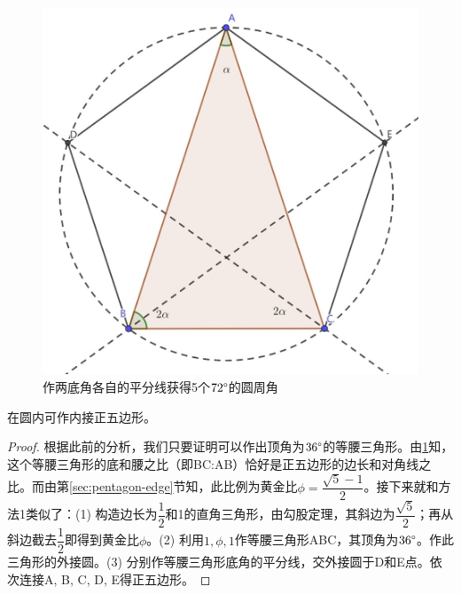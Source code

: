 \documentclass[b5paper]{ctexart}
\begin{document}
\begin{figure}[htbp]
 \centering
 \includegraphics[scale=0.35]{img/triangle-pentagon}
 \caption{作两底角各自的平分线获得5个$72\degree$的圆周角}
 \label{fig:triangle-pentagon}
\end{figure}

\begin{proposition}[欧几里得《原本》，卷4，命题11]
在圆内可作内接正五边形。
\end{proposition}

\begin{proof}
根据此前的分析，我们只要证明可以作出顶角为$36\degree$的等腰三角形。由\cref{fig:triangle-pentagon}知，这个等腰三角形的底和腰之比（即BC:AB）恰好是正五边形的边长和对角线之比。而由第\ref{sec:pentagon-edge}节知，此比例为黄金比$\phi = \dfrac{\sqrt{5} - 1}{2}$。接下来就和方法1类似了：(1) 构造边长为$\dfrac{1}{2}$和1的直角三角形，由勾股定理，其斜边为$\dfrac{\sqrt{5}}{2}$；再从斜边截去$\dfrac{1}{2}$即得到黄金比$\phi$。(2) 利用$1, \phi, 1$作等腰三角形ABC，其顶角为$36\degree$。作此三角形的外接圆。(3) 分别作等腰三角形底角的平分线，交外接圆于D和E点。依次连接A, B, C, D, E得正五边形。
\end{proof}
\end{document}
